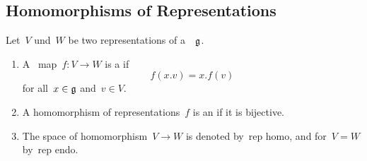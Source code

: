 \subsection{Homomorphisms of Representations}


\begin{definition}
  Let~$V$ und~$W$ be two representations of a~{\liealgebra{$\kf$}}~$\mathfrak{g}$.
  \begin{enumerate}
    \item
      A~{\linear{$\kf$}} map~$f \colon V \to W$ is a  if
      \[
        f(x.v) = x.f(v)
      \]
      for all~$x \in \mathfrak{g}$ and~$v \in V$.
    \item
      A homomorphism of representations~$f$ is an  if it is bijective.
    \item
      The space of homomorphism~$V \to W$ is denoted by~\gls*{rep homo}, and for~$V = W$ by~\gls*{rep endo}.
  \end{enumerate}
\end{definition}

